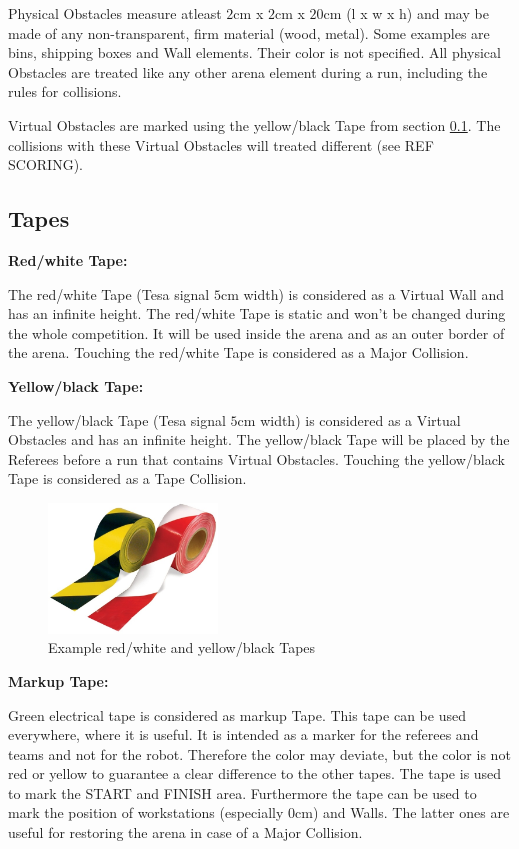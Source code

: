 Physical Obstacles measure atleast $2\si{\centi\meter}$ x $2\si{\centi\meter}$ x $20\si{\centi\meter}$ (l x w x h) and may be made of any non-transparent, firm material (wood, metal). Some examples are bins, shipping boxes and Wall elements. Their color is not specified.
All physical Obstacles are treated like any other arena element during a run, including the rules for collisions.

Virtual Obstacles are marked using the yellow/black Tape from section \ref{subsec:Tapes}. The collisions with these Virtual Obstacles will treated different (see REF SCORING).


\subsection{Tapes}
\label{subsec:Tapes}

\textbf{Red/white Tape:}

The red/white Tape (Tesa signal $5\si{\centi\meter}$ width) is considered as a Virtual Wall and has an infinite height. The red/white Tape is static and won't be changed during the whole competition. It will be used inside the arena and as an outer border of the arena.  Touching the red/white Tape is considered as a Major Collision.

\textbf{Yellow/black Tape:}

The yellow/black Tape (Tesa signal $5\si{\centi\meter}$ width) is considered as a Virtual Obstacles and has an infinite height. The yellow/black Tape will be placed by the Referees before a run that contains Virtual Obstacles. Touching the yellow/black Tape is considered as a Tape Collision.

\begin{figure} [h!]
	\centering
	\includegraphics[width= 0.4\textwidth ]{./images/general_rules/example_barrier_tape}
	\caption{Example red/white and yellow/black Tapes}
	\label{fig:tapes}
\end{figure}

\textbf{Markup Tape:}

Green electrical tape is considered as markup Tape. This tape can be used everywhere, where it is useful. It is intended as a marker for the referees and teams and not for the robot. Therefore the color may deviate, but the color is not red or yellow to guarantee a clear difference to the other tapes. The tape is used to mark the START and FINISH area. Furthermore the tape can be used to mark the position of workstations (especially $0\si{\centi\meter}$) and Walls. The latter ones are useful for restoring the arena in case of a Major Collision.


